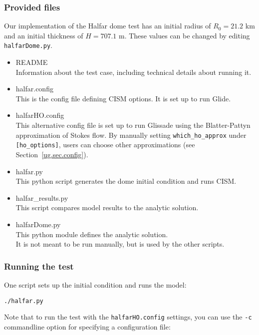 \subsubsection{Provided files}
\label{subsec:halfar_files}

Our implementation of the Halfar dome test has an initial radius of $R_0=21.2$ km and an initial thickness of $H=707.1$ m.
These values can be changed by editing \texttt{halfarDome.py}.

\begin{itemize}
	\item README \\
		Information about the test case, including technical details about running it.
	\item halfar.config \\
	        This is the config file defining CISM options. It is set up to run Glide. \\
  \item halfarHO.config \\
              This alternative config file is set up to run Glissade
              using the Blatter-Pattyn approximation of Stokes flow. By manually setting
              \texttt{which\_ho\_approx} under \texttt{[ho\_options]}, users can choose other approximations 
              (see Section~\ref{ug.sec.config}).
	\item halfar.py \\
		This python script generates the dome initial condition and runs CISM.
	\item halfar\_results.py \\
		This script compares model results to the analytic solution.
	\item halfarDome.py \\
		This python module defines the analytic solution. \\
    		 It is not meant to be run manually, but is used by the other scripts.
\end{itemize}

\subsubsection{Running the test}
One script sets up the initial condition and runs the model:

\texttt{./halfar.py}

Note that to run the test with the \texttt{halfarHO.config} settings, you can use
the \texttt{-c} commandline option for specifying a configuration file:

